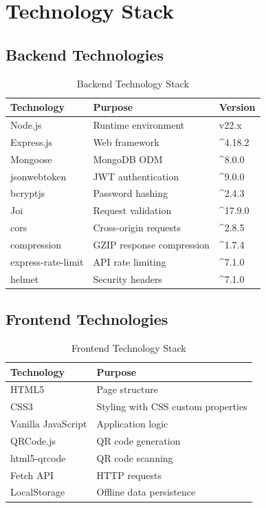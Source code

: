 \documentclass[12pt,a4paper]{article}
\begin{document}
\section{Technology Stack}

\subsection{Backend Technologies}

\begin{table}[H]
\centering
\begin{tabular}{|l|l|l|}
\hline
\textbf{Technology} & \textbf{Purpose} & \textbf{Version} \\
\hline
Node.js & Runtime environment & v22.x \\
\hline
Express.js & Web framework & ^4.18.2 \\
\hline
Mongoose & MongoDB ODM & ^8.0.0 \\
\hline
jsonwebtoken & JWT authentication & ^9.0.0 \\
\hline
bcryptjs & Password hashing & ^2.4.3 \\
\hline
Joi & Request validation & ^17.9.0 \\
\hline
cors & Cross-origin requests & ^2.8.5 \\
\hline
compression & GZIP response compression & ^1.7.4 \\
\hline
express-rate-limit & API rate limiting & ^7.1.0 \\
\hline
helmet & Security headers & ^7.1.0 \\
\hline
\end{tabular}
\caption{Backend Technology Stack}
\end{table}

\subsection{Frontend Technologies}

\begin{table}[H]
\centering
\begin{tabular}{|l|l|}
\hline
\textbf{Technology} & \textbf{Purpose} \\
\hline
HTML5 & Page structure \\
\hline
CSS3 & Styling with CSS custom properties \\
\hline
Vanilla JavaScript & Application logic \\
\hline
QRCode.js & QR code generation \\
\hline
html5-qrcode & QR code scanning \\
\hline
Fetch API & HTTP requests \\
\hline
LocalStorage & Offline data persistence \\
\hline
\end{tabular}
\caption{Frontend Technology Stack}
\end{table}
\end{document}

